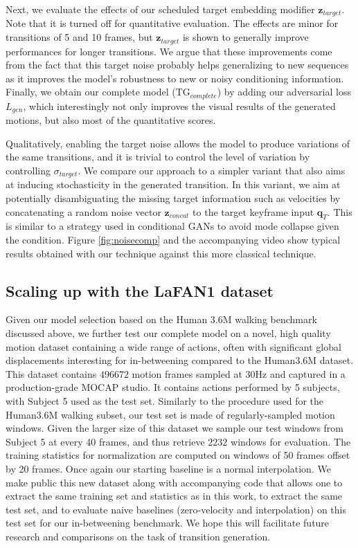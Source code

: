 \documentclass[acmtog]{acmart}
\newcommand{\bz}{\textbf{z}}
\newcommand{\bq}{\textbf{q}}
\begin{document}
Next, we evaluate the effects of our scheduled target embedding modifier $\bz_{\mathit{target}}$. Note that it is turned off for quantitative evaluation. The effects are minor for transitions of 5 and 10 frames, but $\bz_{\mathit{target}}$ is shown to generally improve performances for longer transitions. We argue that these improvements come from the fact that this target noise probably helps generalizing to new sequences as it improves the model's robustness to new or noisy conditioning information. Finally, we obtain our complete model ($\mathrm{TG}_{\mathit{complete}}$) by adding our adversarial loss $L_{\mathit{gen}}$, which interestingly not only improves the visual results of the generated motions, but also most of the quantitative scores.

Qualitatively, enabling the target noise allows the model to produce variations of the same transitions, and it is trivial to control the level of variation by controlling $\sigma_{\mathit{target}}$. We compare our approach to a simpler variant that also aims at inducing stochasticity in the generated transition. In this variant, we aim at potentially disambiguating the missing target information such as velocities by concatenating a random noise vector $\bz_{\mathit{concat}}$ to the target keyframe input $\bq_T$. This is similar to a strategy used in conditional GANs to avoid mode collapse given the condition. Figure \ref{fig:noisecomp} and the accompanying video show typical results obtained with our technique against this more classical technique. \subsection{Scaling up with the LaFAN1 dataset}\label{sec:biggerDataset}
Given our model selection based on the Human 3.6M walking benchmark discussed above, we further test our complete model on a novel, high quality motion dataset containing a wide range of actions, often with significant global displacements interesting for in-betweening compared to the Human3.6M dataset. This dataset contains $\num{496672}$ motion frames sampled at 30Hz and captured in a production-grade MOCAP studio. It contains actions performed by 5 subjects, with Subject 5 used as the test set. Similarly to the procedure used for the Human3.6M walking subset, our test set is made of regularly-sampled motion windows. Given the larger size of this dataset we sample our test windows from Subject 5 at every 40 frames, and thus retrieve $\num{2232}$ windows for evaluation. The training statistics for normalization are computed on windows of 50 frames offset by 20 frames. Once again our starting baseline is a normal interpolation. We make public this new dataset along with accompanying code that allows one to extract the same training set and statistics as in this work, to extract the same test set, and to evaluate naive baselines (zero-velocity and interpolation) on this test set for our in-betweening benchmark. We hope this will facilitate future research and comparisons on the task of transition generation.
\end{document}
